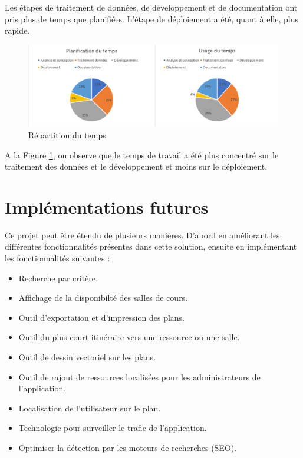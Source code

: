 \documentclass[
    iai, %
    il, %
]{heig-tb}
\begin{document}
Les étapes de traitement de données, de développement et de documentation ont pris plus de temps que planifiées.
L'étape de déploiement a été, quant à elle, plus rapide.

\begin{figure}[h]
    \centering
    \includegraphics[scale=0.4]{RepartitionTemps.png}
    \caption{Répartition du temps}
    \label{fig:temps}
\end{figure}

A la Figure \ref{fig:temps}, on observe que le temps de travail a été plus concentré sur le traitement des données et le développement et moins sur le déploiement.


\section{Implémentations futures}
Ce projet peut être étendu de plusieurs manières.
D'abord en améliorant les différentes fonctionnalités présentes dans cette solution,
ensuite en implémentant les fonctionnalités suivantes :

\begin{itemize}
    \item Recherche par critère.
    \item Affichage de la disponibilté des salles de cours.
    \item Outil d'exportation et d'impression des plans.
    \item Outil du plus court itinéraire vers une ressource ou une salle.
    \item Outil de dessin vectoriel sur les plans.
    \item Outil de rajout de ressources localisées pour les administrateurs de l'application.
    \item Localisation de l'utilisateur sur le plan.
    \item Technologie pour surveiller le trafic de l'application.
    \item Optimiser la détection par les moteurs de recherches (SEO).
\end{itemize}
\end{document}
